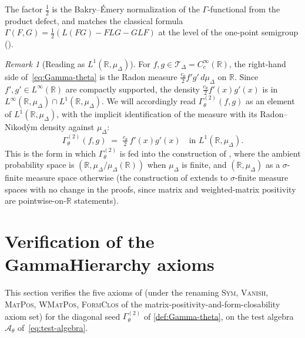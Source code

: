 \documentclass[11pt,reqno]{amsart}
\theoremstyle{plain}
\theoremstyle{definition}
\theoremstyle{remark}
\newtheorem{remark}[theorem]{Remark}
\newcommand{\R}{\mathbb{R}}
\newcommand{\cA}{\mathcal A}
\newcommand{\cT}{\mathcal T}
\begin{document}
The factor $\frac{1}{2}$ is the Bakry--\'Emery normalization
\cite[Eq.~(5.7)]{PrimitiveDivergence} of the
$\Gamma$-functional from the product defect, and matches the
classical formula $\Gamma(F,G)=\frac{1}{2}(L(FG)-FLG-GLF)$ at
the level of the one-point semigroup
(\cite[Ch.~1]{BakryGentilLedoux}).

\begin{remark}[Reading as $L^{1}(\R,\mu_{\Delta})$]\label{rem:Gamma-as-L1}
For $f,g\in\cT_{\Delta}=C_{c}^{\infty}(\R)$, the right-hand side
of~\eqref{eq:Gamma-theta} is the Radon measure
$\frac{c_{\theta}}{2}f'g'\,d\mu_{\Delta}$ on $\R$. Since
$f',g'\in L^{\infty}(\R)$ are compactly supported, the density
$\frac{c_{\theta}}{2}f'(x)g'(x)$ is in
$L^{\infty}(\R,\mu_{\Delta})\cap L^{1}(\R,\mu_{\Delta})$. We
will accordingly read $\Gamma^{(2)}_{\theta}(f,g)$ as an element
of $L^{1}(\R,\mu_{\Delta})$, with the implicit identification
of the measure with its Radon--Nikod\'ym density against
$\mu_{\Delta}$:
\begin{equation}\label{eq:Gamma-L1}
  \Gamma^{(2)}_{\theta}(f,g)\;=\;\tfrac{c_{\theta}}{2}\,f'(x)g'(x)
  \quad\text{in }L^{1}(\R,\mu_{\Delta}).
\end{equation}
This is the form in which $\Gamma^{(2)}_{\theta}$ is fed into
the construction of \cite{GammaHierarchyDivergence}, where the
ambient probability space is $(\R,\mu_{\Delta}/\mu_{\Delta}(\R))$
when $\mu_{\Delta}$ is finite, and $(\R,\mu_{\Delta})$ as a
$\sigma$-finite measure space otherwise (the construction of
\cite{GammaHierarchyDivergence} extends to $\sigma$-finite
measure spaces with no change in the proofs, since matrix and
weighted-matrix positivity are pointwise-on-$\R$ statements).
\end{remark}

\section{Verification of the GammaHierarchy axioms}\label{sec:axioms}

This section verifies the five axioms of
\cite[Ass.~2.4]{GammaHierarchyDivergence} (under the renaming
\textsc{Sym, Vanish, MatPos, WMatPos, FormClos} of the
matrix-positivity-and-form-closability axiom set) for the
diagonal seed $\Gamma^{(2)}_{\theta}$ of
\cref{def:Gamma-theta}, on the test algebra $\cA_{\theta}$
of~\eqref{eq:test-algebra}.
\end{document}
